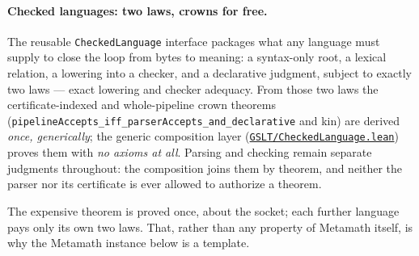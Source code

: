 \documentclass[11pt]{article}
\newcommand{\code}[1]{\texttt{#1}}
\begin{document}
\paragraph{Checked languages: two laws, crowns for free.}  The reusable
\code{CheckedLanguage} interface packages what any language must supply to
close the loop from bytes to meaning: a syntax-only root, a lexical
relation, a lowering into a checker, and a declarative judgment, subject to
exactly two laws --- exact lowering and checker adequacy.  From those two
laws the certificate-indexed and whole-pipeline crown theorems
(\code{pipelineAccepts\_iff\_parserAccepts\_and\_declarative} and kin) are
derived \emph{once, generically}; the generic composition layer
(\href{https://github.com/zariuq/MeTTapedia/blob/main/lean/mettapedia/Mettapedia/GSLT/CheckedLanguage.lean}{\code{GSLT/CheckedLanguage.lean}})
proves them with \emph{no axioms at all}.  Parsing and checking remain
separate judgments throughout: the composition joins them by theorem, and
neither the parser nor its certificate is ever allowed to authorize a
theorem.

\begin{center}
\end{center}

\noindent
The expensive theorem is proved once, about the socket; each further
language pays only its own two laws.  That, rather than any property of
Metamath itself, is why the Metamath instance below is a template.
\end{document}
